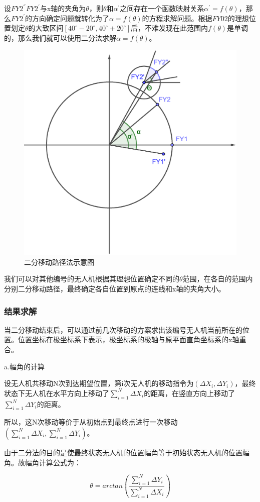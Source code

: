 \documentclass{ctexart}
\begin{document}
  设$FY2^{''}FY2^{'}$与x轴的夹角为$\theta$，则$\theta$和$\alpha^{'}$之间存在一个函数映射关系$\alpha^{'}=f(\theta)$，那么$FY2^{'}$的方向确定问题就转化为了$\alpha=f(\theta)$的方程求解问题。根据$FY02$的理想位置划定$\theta$的大致区间$[40^{\circ}-20^{\circ},40^{\circ}+20^{\circ}]$后，不难发现在此范围内$f(\theta)$是单调的，那么我们就可以使用二分法求解$\alpha=f(\theta)$。

  \begin{figure}[H]
    \centering
    \includegraphics[width=0.55\linewidth]{pic/bisection.eps}
    \caption{二分移动路径法示意图}
    \label{二分移动路径法示意图}
    \end{figure}


    我们可以对其他编号的无人机根据其理想位置确定不同的$\theta$范围，在各自的范围内分别二分移动路径，最终确定各自位置到原点的连线和x轴的夹角大小。
\subsubsection{结果求解}

当二分移动结束后，可以通过前几次移动的方案求出该编号无人机当前所在的位置。位置坐标在极坐标系下表示，极坐标系的极轴与原平面直角坐标系的x轴重合。

a.幅角的计算

设无人机共移动N次到达期望位置，第i次无人机的移动指令为$(\Delta X_i,\Delta Y_i)$，最终状态下无人机在水平方向上移动了$\sum_{i=1}^{N}\Delta X_i$的距离，在竖直方向上移动了$\sum_{i=1}^{N}\Delta Y_i$的距离。

所以，这N次移动等价于从初始点到最终点进行一次移动$(\sum_{i=1}^{N}\Delta X_i,\sum_{i=1}^{N}\Delta Y_i)$。

由于二分法的目的是使最终状态无人机的位置幅角等于初始状态无人机的位置幅角。故幅角计算公式为：

\begin{equation}
  \theta=arctan(\frac{\sum_{i=1}^{N}\Delta Y_i}{\sum_{i=1}^{N}\Delta X_i})
\end{equation}
\end{document}
